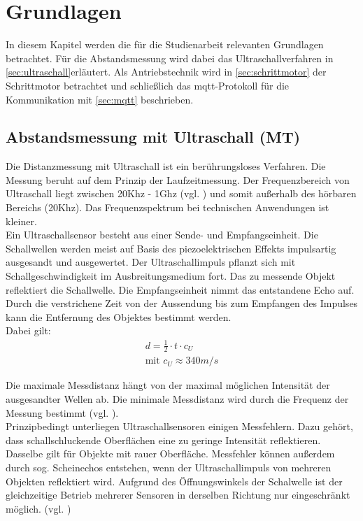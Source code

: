 
\chapter{Grundlagen}
\label{cha:grundlagen}
In diesem Kapitel werden die für die Studienarbeit relevanten Grundlagen betrachtet. Für die Abstandsmessung wird dabei das Ultraschallverfahren in \autoref {sec:ultraschall}erläutert. Als Antriebstechnik wird in \autoref{sec:schrittmotor} der Schrittmotor betrachtet und schließlich das \acrshort{mqtt}-Protokoll für die Kommunikation mit \autoref{sec:mqtt} beschrieben. 

\section{Abstandsmessung mit Ultraschall (MT)}
\label{sec:ultraschall}
Die Distanzmessung mit Ultraschall ist ein berührungsloses Verfahren. Die Messung  beruht auf dem Prinzip der Laufzeitmessung. Der Frequenzbereich von Ultraschall liegt zwischen 20Khz - 1Ghz (vgl. \cite{ultraschallbereich}) und somit außerhalb des hörbaren Bereichs (20Khz).  Das Frequenzspektrum bei technischen Anwendungen ist kleiner. \\
Ein Ultraschallsensor besteht aus einer Sende- und Empfangseinheit. Die Schallwellen werden meist auf Basis des piezoelektrischen Effekts impulsartig ausgesandt und ausgewertet.  Der Ultraschallimpuls pflanzt sich mit Schallgeschwindigkeit im Ausbreitungsmedium fort. Das zu messende Objekt reflektiert die Schallwelle. Die Empfangseinheit nimmt das entstandene Echo auf. Durch die verstrichene Zeit von der Aussendung bis zum Empfangen des Impulses kann die Entfernung des Objektes bestimmt werden. \\

Dabei gilt:
\begin{align}
d = \frac{1}{2} \cdot t\cdot c_U\\
\text{mit }  c_U \approx 340m/s 
\end{align}

\newpage
Die maximale Messdistanz hängt von der maximal möglichen Intensität der ausgesandter Wellen ab. Die minimale Messdistanz wird durch die Frequenz der Messung bestimmt (vgl. \cite{ultraschallUni}). \\
Prinzipbedingt unterliegen Ultraschallsensoren einigen Messfehlern. Dazu gehört, dass schallschluckende Oberflächen eine zu geringe Intensität reflektieren. Dasselbe gilt für Objekte mit rauer Oberfläche. Messfehler können außerdem durch sog. Scheinechos entstehen, wenn der Ultraschallimpuls von mehreren Objekten reflektiert wird. Aufgrund des Öffnungswinkels der Schalwelle ist der gleichzeitige Betrieb mehrerer Sensoren in derselben Richtung nur eingeschränkt möglich. (vgl. \cite{ultraschallBa})

